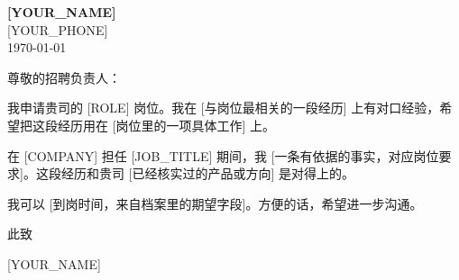 \documentclass[11pt,a4paper,fontset=fandol]{ctexart}
\begin{document}
{\LARGE\bfseries [YOUR\_NAME]}\\[2pt]
[YOUR\_PHONE] \\[8pt]
\today

尊敬的招聘负责人：

我申请贵司的 [ROLE] 岗位。我在 [与岗位最相关的一段经历] 上有对口经验，希望把这段经历用在 [岗位里的一项具体工作] 上。

在 [COMPANY] 担任 [JOB\_TITLE] 期间，我 [一条有依据的事实，对应岗位要求]。这段经历和贵司 [已经核实过的产品或方向] 是对得上的。

我可以 [到岗时间，来自档案里的期望字段]。方便的话，希望进一步沟通。

此致

[YOUR\_NAME]
\end{document}
